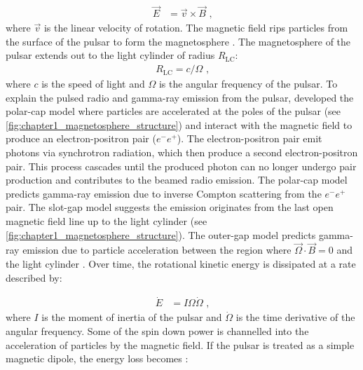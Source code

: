 \begin{equation}
    \begin{aligned}
    \vec{E} &= \vec{v} \times \vec{B}\text{ ,}
    \end{aligned}
\end{equation}
where $\vec{v}$ is the linear velocity of rotation. The magnetic field rips particles from the surface of the pulsar to form the magnetosphere \citep{1968Natur.218..731G,1969ApJ...157..869G}. The magnetosphere of the pulsar extends out to the light cylinder of radius $R_\text{LC}$:
\begin{equation}
    \begin{aligned}
    R_\text{LC}=c/\Omega\text{ ,}
    \end{aligned}
\end{equation}
where $c$ is the speed of light and $\Omega$ is the angular frequency of the pulsar.
\newpar
To explain the pulsed radio and gamma-ray emission from the pulsar, \cite{1971ApJ...164..529S} developed the polar-cap model where particles are accelerated at the poles of the pulsar (see \autoref{fig:chapter1_magnetosphere_structure}) and interact with the magnetic field to produce an electron-positron pair ($e^-e^+$). The electron-positron pair emit photons via synchrotron radiation, which then produce a second electron-positron pair. This process cascades until the produced photon can no longer undergo pair production and contributes to the beamed radio emission. The polar-cap model predicts gamma-ray emission due to inverse Compton scattering from the $e^-e^+$ pair. The slot-gap model \citep{1983ApJ...266..215A} suggests the emission originates from the last open magnetic field line up to the light cylinder (see \autoref{fig:chapter1_magnetosphere_structure}). The outer-gap model predicts gamma-ray emission due to particle acceleration between the region where $\vec{\Omega}\cdot\vec{B}=0$ and the light cylinder \citep{1986ApJ...300..500C}.
\newpar
Over time, the rotational kinetic energy is dissipated at a rate described by:

\begin{equation}
    \begin{aligned}
        \dot{E}&=I\Omega\dot{\Omega}\text{ ,}
    \end{aligned}
\end{equation}
\noindent where $I$ is the moment of inertia of the pulsar and $\dot{\Omega}$ is the time derivative of the angular frequency. Some of the spin down power is channelled into the acceleration of particles by the magnetic field. If the pulsar is treated as a simple magnetic dipole, the energy loss becomes \citep{Slane2017}: 

